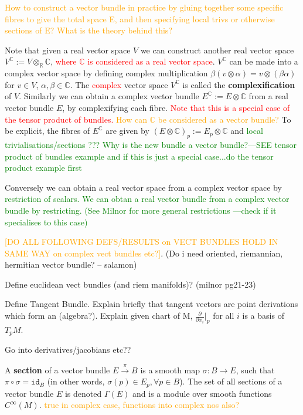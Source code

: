 \documentclass[a4paper]{article}
\theoremstyle{definition} \newtheorem*{definition}{Definition}
\theoremstyle{definition} \newtheorem*{definitions}{Definitions}
\theoremstyle{plain} \newtheorem{theorem}{Theorem}[section]
\theoremstyle{plain} \newtheorem{proposition}[theorem]{Proposition}
\theoremstyle{plain} \newtheorem{corollary}[theorem]{Corollary}
\theoremstyle{plain} \newtheorem{lemma}[theorem]{Lemma}
\theoremstyle{plain} \newtheorem{example}[theorem]{Example}
\newcommand{\checkCorrect}[1]{\textcolor{red}{#1}}
\newcommand{\question}[1]{\textcolor{orange}{#1}}
\newcommand{\finish}[1]{\textcolor{green}{#1}}
\newcommand{\defn}[1]{\textbf{#1}}
\newcommand{\realnos}{\mathbb{R}}
\newcommand{\complexnos}{\mathbb{C}}
\newcommand{\id}{\mathtt{id}}
\begin{document}
\question{How to construct a vector bundle in practice by gluing together some specific fibres to give the total space E, and then specifying local trivs or otherwise sections of E? What is the theory behind this?}

Note that given a real vector space $V$ we can construct another real vector space $V^\complexnos := V\otimes_\realnos \complexnos$, \checkCorrect{where $\complexnos$ is considered as a real vector space}. $V^\complexnos$ can be made into a complex vector space by defining complex multiplication $\beta(v\otimes \alpha) = v\otimes (\beta \alpha)$ for $v\in V$, $\alpha, \beta \in \complexnos$. The \checkCorrect{complex} vector space $V^\complexnos$ is called the \defn{complexification} of $V$. Similarly we can obtain a complex vector bundle $E^\complexnos := E\otimes \complexnos$ from a real vector bundle $E$, by complexifying each fibre. \checkCorrect{Note that this is a special case of the tensor product of bundles. \question{How can $\complexnos$ be considered as a vector bundle?}} To be explicit, the fibres of $E^\complexnos$ are given by $(E\otimes \complexnos)_p := E_p\otimes \complexnos$ and \finish{local trivialisations/sections ??? Why is the new bundle a vector bundle?---SEE tensor product of bundles example and if this is just a special case...do the tensor product example first}

Conversely we can obtain a real vector space from a complex vector space by \finish{restriction of scalars. We can obtan a real vector bundle from a complex vector bundle by restricting. (See Milnor for more general restrictions ---check if it specialises to this case)}

\question{[DO ALL FOLLOWING DEFS/RESULTS on VECT BUNDLES HOLD IN SAME WAY on complex vect bundles etc?]}. (Do i need oriented, riemannian, hermitian vector bundle? -- salamon)

Define euclidean vect bundles (and riem manifolds)? (milnor pg21-23)

Define Tangent Bundle. 
Explain briefly that tangent vectors are point derivations which form an (algebra?).
Explain given chart of M, $\frac{\partial}{\partial{x_i}} |_p$ for all $i$ is a basis of $T_p M$.

Go into derivatives/jacobians etc??

A \defn{section} of a vector bundle $E\xrightarrow{\pi} B$ is a smooth map $\sigma:B\rightarrow E$, such that $\pi \circ \sigma=\id_B$ (in other words, $\sigma(p)\in E_p, \forall p\in B$). The set of all sections of a vector bundle $E$ is denoted $\Gamma (E)$ and is a module over smooth functions $C^\infty(M)$. \question{true in complex case, functions into complex nos also?}
\end{document}
